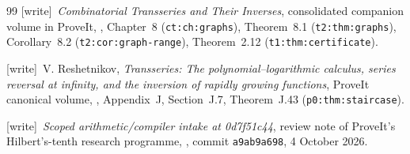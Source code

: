 \documentclass[11pt]{article}
\theoremstyle{definition}
\theoremstyle{remark}
\newcommand{\wtag}{\textup{[write]}}
\begin{document}
\begin{thebibliography}{99}
\wtag\ \emph{Combinatorial Transseries and Their Inverses}, consolidated
companion volume in ProveIt,
,
Chapter~8 (\texttt{ct:ch:graphs}), Theorem~8.1 (\texttt{t2:thm:graphs}),
Corollary~8.2 (\texttt{t2:cor:graph-range}), Theorem~2.12
(\texttt{t1:thm:certificate}).

\wtag\ V. Reshetnikov, \emph{Transseries: The polynomial--logarithmic
calculus, series reversal at infinity, and the inversion of rapidly
growing functions}, ProveIt canonical volume,
,
Appendix~J, Section~J.7, Theorem~J.43 (\texttt{p0:thm:staircase}).

\wtag\ \emph{Scoped arithmetic/compiler intake at 0d7f51c44}, review note
of ProveIt's Hilbert's-tenth research programme,
,
commit \texttt{a9ab9a698}, 4 October 2026.
\end{thebibliography}
\end{document}
